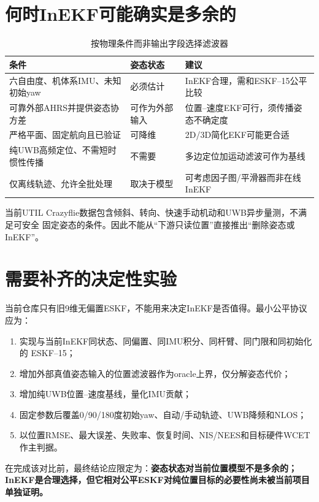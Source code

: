 \documentclass[11pt,a4paper]{ctexart}
\begin{document}
\section{何时InEKF可能确实是多余的}

\begin{table}[H]
\centering
\caption{按物理条件而非输出字段选择滤波器}
\begin{tabularx}{\textwidth}{p{4.2cm}p{3.1cm}X}
\toprule
条件 & 姿态状态 & 建议\\
\midrule
六自由度、机体系IMU、未知初始yaw & 必须估计 & InEKF合理，需和ESKF--15公平比较\\
可靠外部AHRS并提供姿态协方差 & 可作为外部输入 & 位置--速度EKF可行，须传播姿态不确定度\\
严格平面、固定航向且已验证 & 可降维 & 2D/3D简化EKF可能更合适\\
纯UWB高频定位、不需短时惯性传播 & 不需要 & 多边定位加运动滤波可作为基线\\
仅离线轨迹、允许全批处理 & 取决于模型 & 可考虑因子图/平滑器而非在线InEKF\\
\bottomrule
\end{tabularx}
\end{table}

当前UTIL Crazyflie数据包含倾斜、转向、快速手动机动和UWB异步量测，不满足可安全
固定姿态的条件。因此不能从“下游只读位置”直接推出“删除姿态或InEKF”。

\section{需要补齐的决定性实验}

当前仓库只有旧9维无偏置ESKF，不能用来决定InEKF是否值得。最小公平协议应为：
\begin{enumerate}
 \item 实现与当前InEKF同状态、同偏置、同IMU积分、同杆臂、同门限和同初始化的
 ESKF--15；
 \item 增加外部真值姿态输入的位置滤波器作为oracle上界，仅分解姿态代价；
 \item 增加纯UWB位置--速度基线，量化IMU贡献；
 \item 固定参数后覆盖0/90/180度初始yaw、自动/手动轨迹、UWB降频和NLOS；
 \item 以位置RMSE、最大误差、失败率、恢复时间、NIS/NEES和目标硬件WCET作主判据。
\end{enumerate}

在完成该对比前，最终结论应限定为：\textbf{姿态状态对当前位置模型不是多余的；
InEKF是合理选择，但它相对公平ESKF对纯位置目标的必要性尚未被当前项目单独证明。}
\end{document}
